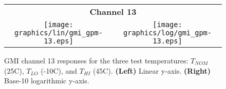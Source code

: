 \begin{figure}[H]
  \centering
  \begin{tabular}{c c}
    \multicolumn{2}{c}{\sffamily\textbf{Channel 13}}\\
    \texttt{[image: graphics/lin/gmi\_gpm-13.eps]} &
    \texttt{[image: graphics/log/gmi\_gpm-13.eps]}
  \end{tabular}
  \caption{GMI channel 13 responses for the three test temperatures: $T_{NOM}$ (25\textdegree{}C), $T_{LO}$ (-10\textdegree{}C), and $T_{HI}$ (45\textdegree{}C). \textbf{(Left)} Linear y-axis. \textbf{(Right)} Base-10 logarithmic y-axis.}
  \label{fig:ch10-13_response}
\end{figure}
